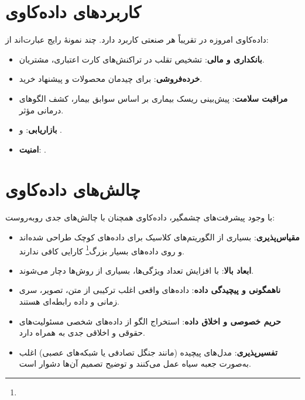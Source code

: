 \section{کاربردهای داده‌کاوی}

داده‌کاوی امروزه در تقریباً هر صنعتی کاربرد دارد. چند نمونهٔ رایج عبارت‌اند از:

\begin{itemize}
    \item \textbf{بانکداری و مالی}: تشخیص تقلب در تراکنش‌های کارت اعتباری،
           مشتریان.
    \item \textbf{خرده‌فروشی}:  برای
          چیدمان محصولات و پیشنهاد خرید.
    \item \textbf{مراقبت سلامت}: پیش‌بینی ریسک بیماری بر اساس سوابق بیمار،
          کشف الگوهای درمانی مؤثر.
    \item \textbf{بازاریابی}:  و
          .
    \item \textbf{امنیت}: .
\end{itemize}

\section{چالش‌های داده‌کاوی}

با وجود پیشرفت‌های چشمگیر، داده‌کاوی همچنان با چالش‌های جدی روبه‌روست:

\begin{itemize}
    \item \textbf{مقیاس‌پذیری}: بسیاری از الگوریتم‌های کلاسیک برای داده‌های
          کوچک طراحی شده‌اند و روی داده‌های بسیار بزرگ\footnote{}
          کارایی کافی ندارند.
    \item \textbf{ابعاد بالا}: با افزایش تعداد ویژگی‌ها، بسیاری از روش‌ها
          دچار  می‌شوند.
    \item \textbf{ناهمگونی و پیچیدگی داده}: داده‌های واقعی اغلب ترکیبی از
          متن، تصویر، سری زمانی و داده رابطه‌ای هستند.
    \item \textbf{حریم خصوصی و اخلاق داده}: استخراج الگو از داده‌های شخصی
          مسئولیت‌های حقوقی و اخلاقی جدی به همراه دارد.
    \item \textbf{تفسیرپذیری}: مدل‌های پیچیده (مانند جنگل تصادفی یا شبکه‌های
          عصبی) اغلب به‌صورت جعبه سیاه عمل می‌کنند و توضیح تصمیم آن‌ها دشوار است.
\end{itemize}

